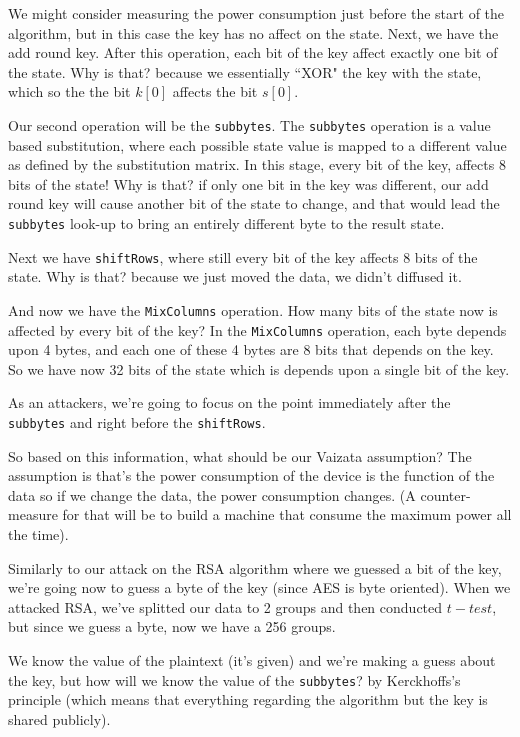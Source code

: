 We might consider measuring the power consumption just before the start of the algorithm, but in this case the key has no affect on the state. 
Next, we have the add round key. After this operation, each bit of the key affect exactly one bit of the state. Why is that? because we essentially ``XOR" the key with the state, which so the the bit $k[0]$ affects the bit $s[0]$.

Our second operation will be the \texttt{subbytes}. The \texttt{subbytes} operation is a value based substitution, where each possible state value is mapped to a different value as defined by the substitution matrix. In this stage, every bit of the key, affects 8 bits of the state! Why is that? if only one bit in the key was different, our add round key will cause another bit of the state to change, and that would lead the \texttt{subbytes} look-up to bring an entirely different byte to the result state.

Next we have \texttt{shiftRows}, where still every bit of the key affects 8 bits of the state. Why is that? because we just moved the data, we didn't diffused it.

And now we have the \texttt{MixColumns} operation. How many bits of the state now is affected by every bit of the key? In the \texttt{MixColumns} operation, each byte depends upon 4 bytes, and each one of these 4 bytes are 8 bits that depends on the key. So we have now 32 bits of the state which is depends upon a single bit of the key.

As an attackers, we're going to focus on the point immediately after the \texttt{subbytes} and right before the \texttt{shiftRows}. 

So based on this information, what should be our Vaizata assumption?
The assumption is that's the power consumption of the device is the function of the data so if we change the data, the power consumption changes. (A counter-measure for that will be to build a machine that consume the maximum power all the time).

Similarly to our attack on the RSA algorithm where we guessed a bit of the key, we're going now to guess a byte of the key (since AES is byte oriented). When we attacked RSA, we've splitted our data to 2 groups and then conducted $t-test$, but since we guess a byte, now we have a 256 groups. 

We know the value of the plaintext (it's given) and we're making a guess about the key, but how will we know the value of the \texttt{subbytes}? by Kerckhoffs's principle (which means that everything regarding the algorithm but the key is shared publicly).

